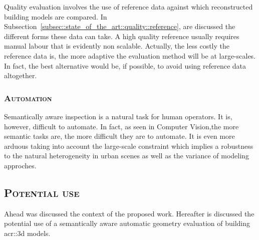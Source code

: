             Quality evaluation involves the use of reference data against which reconstructed building models are compared.
            In Subsection~\ref{subsec::state_of_the_art::quality::reference}, are discussed the different forms these data can take.
            A high quality reference usually requires manual labour that is evidently non scalable.
            Actually, the less costly the reference data is, the more adaptive the evaluation method will be at large-scales.
            In fact, the best alternative would be, if possible, to avoid using reference data altogether.

        \subsubsection{\textsc{Automation}}
            Semantically aware inspection is a natural task for human operators.
            It is, however, difficult to automate.
            In fact, as seen in Computer Vision,\addref the more semantic tasks are, the more difficult they are to automate.
            It is even more arduous taking into account the large-scale constraint which implies a robustness to the natural heterogeneity in urban scenes as well as the variance of modeling approches.

    \subsection{\textsc{Potential use}}
        \label{subsec::introduction::contributions::use}
        Ahead was discussed the context of the proposed work.
        Hereafter is discussed the potential use of a semantically aware automatic geometry evaluation of building \gls{acr::3d} models.
